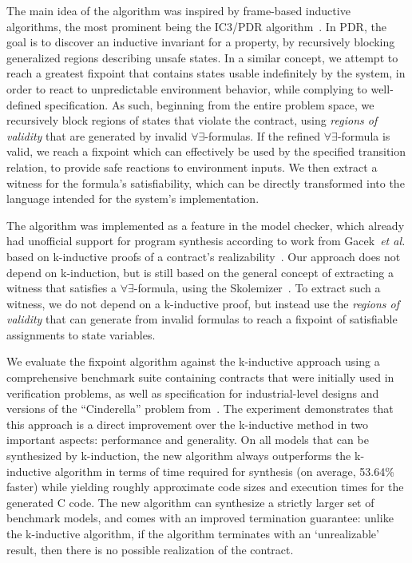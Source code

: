 The main idea of the algorithm was inspired by frame-based inductive algorithms, the most prominent being the IC3/PDR algorithm~\cite{bradley2011sat,een2011efficient}. In PDR, the goal is to discover an inductive invariant for a property, by recursively blocking generalized regions describing unsafe states. In a similar concept, we attempt
to reach a greatest fixpoint that contains states usable indefinitely by the
system, in order to react to unpredictable environment behavior, while
complying to well-defined specification. As such, beginning from the entire
problem space, we recursively block regions of states that violate the contract, using \textit{regions of validity} that are
generated by invalid $\forall\exists$-formulas. If the refined
$\forall\exists$-formula is valid, we reach a fixpoint which can effectively be used by the specified transition relation, to
provide safe reactions to environment inputs. We then extract a witness for the
formula's satisfiability, which can be directly transformed into the
language intended for the system's implementation.

The algorithm was implemented as a feature in the \jkind model checker, which
already had unofficial support for program synthesis according to work from
Gacek~\textit{et al.} based on k-inductive proofs of a contract's
realizability~\cite{gacek2015towards,katis2016towards,katis2016synthesis}.
Our approach does not depend on k-induction, but is still based on the general
concept of extracting a witness that satisfies a $\forall\exists$-formula, using
the \aeval Skolemizer~\cite{fedyukovich2015automated}. To extract such a witness, we do not depend on a k-inductive proof, but instead use the \textit{regions of validity} that \aeval can generate from invalid formulas to reach a fixpoint of satisfiable assignments to state variables.

We evaluate the fixpoint algorithm against the k-inductive approach using a comprehensive benchmark suite containing contracts that were initially used in verification problems, as well as specification for industrial-level designs and versions of the ``Cinderella'' problem from~\cite{beyene2014constraint}.  The experiment demonstrates that this approach is a direct improvement over the k-inductive method in two important aspects: performance and generality.  On all models that can be synthesized by k-induction, the new algorithm always outperforms the k-inductive algorithm in terms of time required for synthesis (on average, 53.64\% faster) while yielding roughly approximate code sizes and execution times for the generated C code.  The new algorithm can synthesize a strictly larger set of benchmark models, and comes with an improved termination guarantee: unlike the k-inductive algorithm, if the algorithm terminates with an `unrealizable' result, then there is no possible realization of the contract.

